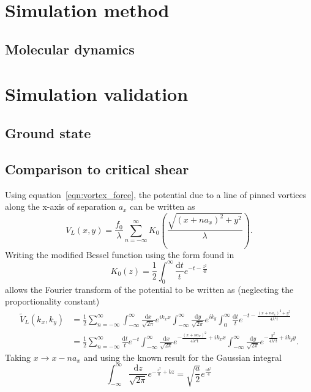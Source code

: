 \documentclass{article}
\numberwithin{equation}{section}
\begin{document}
\section{Simulation method}
\subsection{Molecular dynamics}

\section{Simulation validation}
\subsection{Ground state}
\subsection{Comparison to critical shear}
Using equation~\ref{eqn:vortex_force}, the potential due to a line of pinned vortices along the x-axis of separation $a_x$ can be written as \cite{Watkins2016DensitySuperconductors}
\begin{equation}
    V_L(x, y) = \frac{f_0}{\lambda}\sum_{n=-\infty}^\infty K_0 \left( \frac{\sqrt{(x + na_x)^2 + y^2}}{\lambda} \right).
\end{equation}
Writing the modified Bessel function using the form found in \cite{I.S.Gradshteyn2015TableProducts}
\begin{equation}
    K_0(z) = \frac{1}{2}\int_0^\infty \frac{\mathrm{d}t}{t}e^{-t-\frac{z^2}{4t}}
\end{equation}
allows the Fourier transform of the potential to be written as (neglecting the proportionality constant)
\begin{align*}
    \tilde{V}_L(k_x, k_y) &= \frac{1}{2}\sum_{n=-\infty}^\infty \int_{-\infty}^\infty\frac{\mathrm{d}x}{\sqrt{2\pi}}e^{ik_xx} \int_{-\infty}^\infty\frac{\mathrm{d}y}{\sqrt{2\pi}}e^{ik_y} \int_0^\infty\frac{\mathrm{d}t}{t}e^{-t-\frac{(x+na_x)^2 + y^2}{4\lambda^2t}} \\
    &= \frac{1}{2}\sum_{n=-\infty}^\infty \frac{\mathrm{d}t}{t}e^{-t} \int_{-\infty}^\infty\frac{\mathrm{d}x}{\sqrt{2\pi}}e^{-\frac{(x+na_x)^2}{4\lambda^2t}+ik_xx}
    \int_{-\infty}^\infty\frac{\mathrm{d}y}{\sqrt{2\pi}}e^{-\frac{y^2}{4\lambda^2t}+ik_yy}.
\end{align*}
Taking $x \rightarrow x - na_x$ and using the known result for the Gaussian integral
\begin{equation}
    \int_{-\infty}^\infty\frac{\mathrm{d}z}{\sqrt{2\pi}}e^{-\frac{z^2}{a}+bz} = \sqrt{\frac{a}{2}}e^{\frac{ab^2}{4}}
\end{equation}
\end{document}
